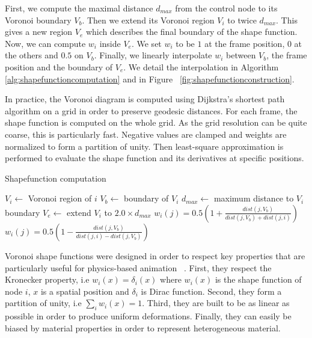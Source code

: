 First, we compute the maximal distance $d_{max}$ from the control node to its Voronoi boundary $V_{b}$. Then we extend its Voronoi region $V_{i}$ to twice $d_{max}$. This gives a new region $V_{e}$ which describes the final boundary of the shape function. Now, we can compute $w_{i}$ inside $V_{e}$. We set $w_{i}$ to be $1$ at the frame position, $0$ at the others and $0.5$ on $V_{b}$. Finally, we linearly interpolate $w_{i}$ between $V_{b}$, the frame position and the boundary of $V_{e}$. We detail the interpolation in Algorithm~ \ref{alg:shapefunctioncomputation} and in Figure~ \ref{fig:shapefunctionconstruction}.

In practice, the Voronoi diagram is computed using Dijkstra's shortest path algorithm on a grid in order to preserve geodesic distances. For each frame, the shape function is computed on the whole grid. As the grid resolution can be quite coarse, this is particularly fast. Negative values are clamped and weights are normalized to form a partition of unity. Then least-square approximation is performed to evaluate the shape function and its derivatives at specific positions.

\begin{algorithm}[h]
\caption[Frame-based cutting: Shapefunction computation]{\label{alg:shapefunctioncomputation}Shapefunction computation}
\begin{algorithmic}[1]
	\State $V_{i} \gets$ Voronoi region of $i$
	\State $V_{b} \gets$ boundary of $V_{i}$	
	\State $d_{max} \gets$ maximum distance to $V_{i}$ boundary
	\State $V_{e} \gets$ extend $V_{i}$ to $2.0 \times d_{max}$
	\State $\displaystyle w_{i}(j) = 0.5\left(1 + \frac{dist(j,V_{b})}{dist(j,V_{b})+dist(j,i)}\right)$
		\State $\displaystyle w_{i}(j) = 0.5\left(1 - \frac{dist(j,V_{b})}{dist(j,i)-dist(j,V_{b})}\right)$
	\EndIf
	\EndFor
\EndFor
\EndProcedure
\end{algorithmic}
\end{algorithm}

Voronoi shape functions were designed in order to respect key properties that are particularly useful for physics-based animation~\cite{Faure2011} . First, they respect the Kronecker property, i.e $w_{i}(x) = \delta_{i}(x)$ where $w_{i}(x)$ is the shape function of node $i$, $x$ is a spatial position and $\delta_{i}$ is Dirac function. Second, they form a partition of unity, i.e $\sum_{i}w_{i}(x) = 1$. Third, they are built to be as linear as possible in order to produce uniform deformations. Finally, they can easily be biased by material properties in order to represent heterogeneous material.

